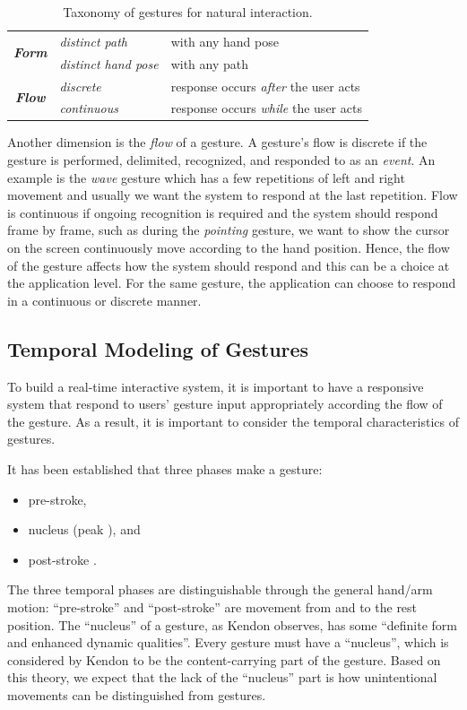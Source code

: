 \documentclass[conference]{IEEEtran}
\begin{document}
\begin{table}[t]
\caption{Taxonomy of gestures for natural interaction.}
\label{tab:taxonomy}
\centering
\begin{tabular}{|c|l|l|}
\hline
\multirow{2}{*}{\textbf{\textit{Form}}} & \textit{distinct path} & with any hand
pose
\\
\cline{2-3} 
                               & \textit{distinct hand pose} & with any path \\
\hline
\multirow{2}{*}{\textbf{\textit{Flow}}} & \textit{discrete} & response occurs
\textit{after} the user acts \\
\cline{2-3}
              & \textit{continuous} & response occurs \textit{while} the user
              acts \\
\hline
\end{tabular}
\end{table}

Another dimension is the \textit{flow} of a gesture. A gesture's flow is
discrete if the gesture is performed, delimited, recognized, and responded to
as an \textit{event}. An example is the \textit{wave} gesture which has a few
repetitions of left and right movement and usually we want the system to respond
at the last repetition. Flow is continuous if ongoing recognition is required
and the system should respond frame by frame, such as during the
\textit{pointing} gesture, we want to show the cursor on the screen continuously
move according to the hand position. Hence, the flow of the gesture affects how
the system should respond and this can be a choice at the application level. For
the same gesture, the application can choose to respond in a continuous or
discrete manner. 

\subsection{Temporal Modeling of Gestures}
To build a real-time interactive system, it is important to have a responsive
system that respond to users' gesture input appropriately according the flow of
the gesture. As a result, it is important to consider the temporal
characteristics of gestures.

It has been established that three phases make a gesture:
\begin{itemize}
  \item pre-stroke,
  \item nucleus (peak \cite{mcneill82}), and
  \item post-stroke \cite{Pavlovic97}.
\end{itemize}
The three temporal phases are distinguishable through the general hand/arm
motion: ``pre-stroke'' and ``post-stroke'' are movement from and to the
rest position. The ``nucleus'' of a gesture,
as Kendon \cite{kendon86} observes, has some ``definite form and enhanced dynamic
qualities''. Every gesture must have a ``nucleus'', which is considered by
Kendon to be the content-carrying part of the gesture. Based on this theory, we
expect that the lack of the ``nucleus'' part is how unintentional movements can
be distinguished from gestures. 
\end{document}
